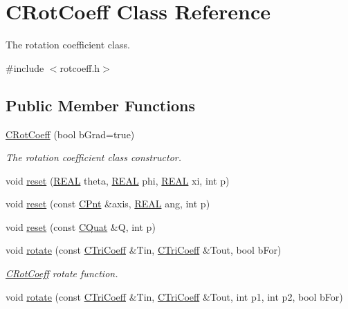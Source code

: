 \hypertarget{classCRotCoeff}{\section{C\-Rot\-Coeff Class Reference}
\label{classCRotCoeff}
}


The rotation coefficient class.  




{\ttfamily \#include $<$rotcoeff.\-h$>$}

\subsection*{Public Member Functions}
\begin{DoxyCompactItemize}
\item 
\hyperlink{classCRotCoeff_a5dae485fb061a3c231365159aefc9bb5}{C\-Rot\-Coeff} (bool b\-Grad=true)
\begin{DoxyCompactList}\small\item\em The rotation coefficient class constructor. \end{DoxyCompactList}\item 
void \hyperlink{classCRotCoeff_aa52111e9c4cb2949dfae960437742536}{reset} (\hyperlink{util_8h_a5821460e95a0800cf9f24c38915cbbde}{R\-E\-A\-L} theta, \hyperlink{util_8h_a5821460e95a0800cf9f24c38915cbbde}{R\-E\-A\-L} phi, \hyperlink{util_8h_a5821460e95a0800cf9f24c38915cbbde}{R\-E\-A\-L} xi, int p)
\item 
void \hyperlink{classCRotCoeff_a4a6461f2947e6c07d4a28da4d87a8935}{reset} (const \hyperlink{classCPnt}{C\-Pnt} \&axis, \hyperlink{util_8h_a5821460e95a0800cf9f24c38915cbbde}{R\-E\-A\-L} ang, int p)
\item 
void \hyperlink{classCRotCoeff_a6dea4a3900cc4ac8c012cc8790b92719}{reset} (const \hyperlink{classCQuat}{C\-Quat} \&Q, int p)
\item 
void \hyperlink{classCRotCoeff_aa9b14ebaa2c45a8fa740fa36d9f31d2c}{rotate} (const \hyperlink{classCTriCoeff}{C\-Tri\-Coeff} \&Tin, \hyperlink{classCTriCoeff}{C\-Tri\-Coeff} \&Tout, bool b\-For)
\begin{DoxyCompactList}\small\item\em \hyperlink{classCRotCoeff}{C\-Rot\-Coeff} rotate function. \end{DoxyCompactList}\item 
void \hyperlink{classCRotCoeff_a6d65091921f8baa2175c97758dff4e16}{rotate} (const \hyperlink{classCTriCoeff}{C\-Tri\-Coeff} \&Tin, \hyperlink{classCTriCoeff}{C\-Tri\-Coeff} \&Tout, int p1, int p2, bool b\-For)

\end{DoxyCompactItemize}

